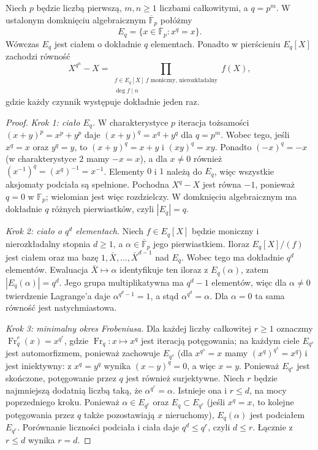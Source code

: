 \begin{twierdzenie}
\label{aa:tw:finite-frobenius-roots}
Niech $p$ będzie liczbą pierwszą, $m,n\ge1$ liczbami
całkowitymi, a $q=p^m$. W ustalonym domknięciu
algebraicznym $\overline{\mathbb F}_p$ połóżmy
\[
E_q=\{x\in\overline{\mathbb F}_p:x^q=x\}.
\]
Wówczas $E_q$ jest ciałem o dokładnie $q$ elementach.
Ponadto w pierścieniu $E_q[X]$ zachodzi równość
\[
X^{q^n}-X=\prod_{\substack{f\in E_q[X]\ \text{$f$ moniczny, nierozkładalny}\\ \deg f\mid n}}f(X),
\]
gdzie każdy czynnik występuje dokładnie jeden raz.
\end{twierdzenie}
\begin{proof}
\emph{Krok 1: ciało $E_q$.} W charakterystyce $p$
iteracja tożsamości $(x+y)^p=x^p+y^p$ daje
$(x+y)^q=x^q+y^q$ dla $q=p^m$.
Wobec tego, jeśli $x^q=x$ oraz $y^q=y$, to
$(x+y)^q=x+y$ i $(xy)^q=xy$.
Ponadto $(-x)^q=-x$ (w charakterystyce $2$ mamy
$-x=x$), a dla $x\ne0$ również
$(x^{-1})^q=(x^q)^{-1}=x^{-1}$.
Elementy $0$ i $1$ należą do $E_q$, więc wszystkie
aksjomaty podciała są spełnione.
Pochodna $X^q-X$ jest równa $-1$, ponieważ
$q=0$ w $\mathbb F_p$; wielomian jest więc rozdzielczy.
W domknięciu algebraicznym ma dokładnie $q$ różnych
pierwiastków, czyli $|E_q|=q$.

\emph{Krok 2: ciało o $q^d$ elementach.}
Niech $f\in E_q[X]$ będzie moniczny i nierozkładalny
stopnia $d\ge1$, a $\alpha\in\overline{\mathbb F}_p$
jego pierwiastkiem. Iloraz $E_q[X]/(f)$ jest ciałem
oraz ma bazę $1,\bar X,\ldots,\bar X^{d-1}$ nad
$E_q$. Wobec tego ma dokładnie $q^d$ elementów.
Ewaluacja $\bar X\mapsto\alpha$ identyfikuje ten
iloraz z $E_q(\alpha)$, zatem
$|E_q(\alpha)|=q^d$.
Jego grupa multiplikatywna ma $q^d-1$ elementów,
więc dla $\alpha\ne0$ twierdzenie Lagrange'a daje
$\alpha^{q^d-1}=1$, a stąd
$\alpha^{q^d}=\alpha$. Dla $\alpha=0$ ta sama
równość jest natychmiastowa.

\emph{Krok 3: minimalny okres Frobeniusa.}
Dla każdej liczby całkowitej $r\ge1$ oznaczmy
$\operatorname{Fr}_q^r(x)=x^{q^r}$, gdzie
$\operatorname{Fr}_q:x\mapsto x^q$ jest iteracją
potęgowania; na każdym ciele $E_{q^s}$ jest automorfizmem,
ponieważ zachowuje $E_{q^s}$ (dla $x^{q^s}=x$ mamy
$(x^q)^{q^s}=x^q$) i jest iniektywny:
z $x^q=y^q$ wynika $(x-y)^q=0$, a więc $x=y$.
Ponieważ $E_{q^s}$ jest skończone, potęgowanie przez
$q$ jest również surjektywne.
Niech $r$ będzie najmniejszą dodatnią liczbą taką, że
$\alpha^{q^r}=\alpha$. Istnieje ona i $r\le d$, na
mocy poprzedniego kroku.
Ponieważ $\alpha\in E_{q^r}$ oraz $E_q\subset E_{q^r}$
(jeśli $x^q=x$, to kolejne potęgowania przez $q$
także pozostawiają $x$ nieruchomy),
$E_q(\alpha)$ jest podciałem $E_{q^r}$.
Porównanie liczności podciała i ciała daje
$q^d\le q^r$, czyli $d\le r$. Łącznie z
$r\le d$ wynika $r=d$.


\end{proof}
